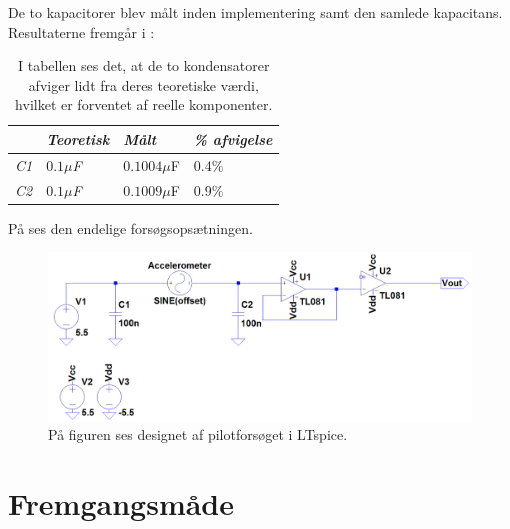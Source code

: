 \noindent De to kapacitorer blev målt inden implementering samt den samlede kapacitans. Resultaterne fremgår i  :
\begin{table}[H]
	\centering
	\begin{tabular}{|l|l|l|l|}\hline
		& \textit{Teoretisk} & \textit{Målt} & \textit{\% afvigelse} \\ \hline
		\textit{C1}       & \textit{$0.1\mu$F} & $0.1004\mu$F  & $0.4\%$               \\ \hline		
		\textit{C2}       & \textit{$0.1\mu$F} & $0.1009\mu$F  & $0.9\%$               \\ \hline
	\end{tabular}
	\caption{I tabellen ses det, at de to kondensatorer afviger lidt fra deres teoretiske værdi, hvilket er forventet af reelle komponenter.}
	\label{Tab:Acc_kondensator_pilot}
\end{table}

\noindent På  ses den endelige forsøgsopsætningen.
\begin{figure}[H]
	\centering
	\includegraphics[scale=0.4]{figures/Bilag/Acc_medbuffer.png}
	\caption{På figuren ses designet af pilotforsøget i LTspice.}
	\label{pforsoeg1}
\end{figure}

\section{Fremgangsmåde}
